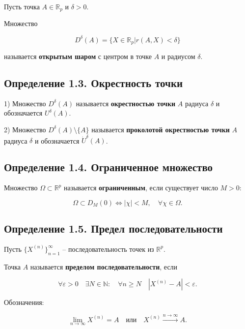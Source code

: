 {Пусть точка \( A \in \mathbb{R}_p \) и \( \delta > 0 \).

Множество



\[
D^\delta(A) = \{X \in \mathbb{R}_p | r(A, X) < \delta \}
\]



называется \textbf{открытым шаром} с центром в точке \( A \) и радиусом \( \delta \).


\subsection*{Определение 1.3. Окрестность точки}

1) Множество \( D^{\delta}(A) \) называется \textbf{окрестностью точки} \( A \) радиуса \( \delta \) и обозначается \( U^{\delta}(A) \).  

2) Множество \( D^{\delta}(A) \setminus \{A\} \) называется \textbf{проколотой окрестностью точки} \( A \) радиуса \( \delta \) и обозначается \( \dot{U}^{\delta}(A) \).  

\subsection*{Определение 1.4. Ограниченное множество}

Множество \( \Omega \subset \mathbb{R}^{p} \) называется \textbf{ограниченным}, если существует число \( M > 0 \):  



\[
\Omega \subset D_{M}(0) \Leftrightarrow |\chi| < M, \quad \forall \chi \in \Omega.
\]



\subsection*{Определение 1.5. Предел последовательности}

Пусть \( \{X^{(n)}\}_{n=1}^{\infty} \) – последовательность точек из \( \mathbb{R}^{p} \).  

Точка \( A \) называется \textbf{пределом последовательности}, если  



\[
\forall \varepsilon > 0 \quad \exists N \in \mathbb{N}: \quad \forall n \geq N \quad |X^{(n)} - A| < \varepsilon.
\]



Обозначения:  

\[
\lim_{n \to \infty} X^{(n)} = A \quad \text{или} \quad X^{(n)} \xrightarrow{n \to \infty} A.
\]


}
